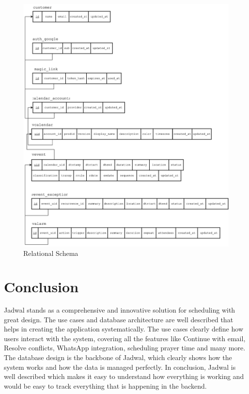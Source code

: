 \documentclass[12pt,a4paper,twoside]{report}
\begin{document}
\begin{figure}[!h]
    \centering
    \includegraphics[width=\textwidth]{images/database-schema.png}
    \caption{Relational Schema}
    \label{fig:relational-schema}
\end{figure}




\section{Conclusion}

Jadwal stands as a comprehensive and innovative solution for scheduling with great design. The use cases and database architecture are well described that helps in creating the application systematically. The use cases clearly define how users interact with the system, covering all the features like Continue with email, Resolve conflicts, WhatsApp integration, scheduling prayer time and many more. The database design is the backbone of Jadwal, which clearly shows how the system works and how the data is managed perfectly. In conclusion, Jadwal is well described which makes it easy to understand how everything is working and would be easy to track everything that is happening in the backend.
\end{document}
